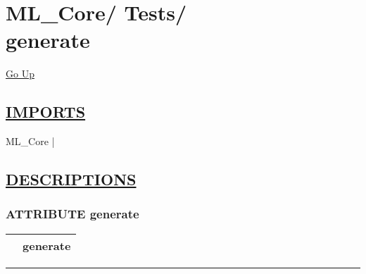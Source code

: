 \chapter*{\color{headfile}
{\large ML\_Core\slash\hspace{0pt}}
{\large Tests\slash\hspace{0pt}}
 \\
generate
}
\hypertarget{ecldoc:toc:ML_Core.Tests.generate}{}
\hyperlink{ecldoc:toc:root/ML_Core/Tests}{Go Up}

\section*{\underline{\textsf{IMPORTS}}}
\begin{doublespace}
{\large
ML\_Core |
}
\end{doublespace}

\section*{\underline{\textsf{DESCRIPTIONS}}}
\subsection*{\textsf{\colorbox{headtoc}{\color{white} ATTRIBUTE}
generate}}

\hypertarget{ecldoc:ml_core.tests.generate}{}

{\renewcommand{\arraystretch}{1.5}
\begin{tabularx}{\textwidth}{|>{\raggedright\arraybackslash}l|X|}
\hline
\hspace{0pt}\mytexttt{\color{red} } & \textbf{generate} \\
\hline
\end{tabularx}
}

\par


\rule{\linewidth}{0.5pt}
